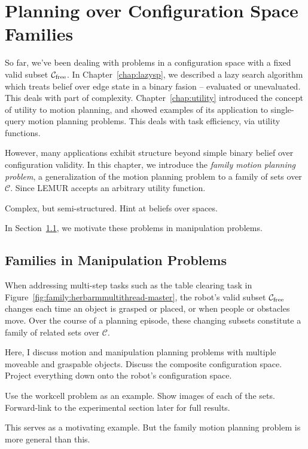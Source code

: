 \chapter{Planning over Configuration Space Families}
\label{chap:family}

So far, we've been dealing with problems in a configuration space
with a fixed valid subset $\mathcal{C}_{\mbox{\scriptsize free}}$.
In Chapter~\ref{chap:lazysp},
we described a lazy search algorithm which treats belief over edge
state in a binary fasion -- evaluated or unevaluated.
This deals with part of complexity.
Chapter~\ref{chap:utility} introduced the concept of utility to
motion planning,
and showed examples of its application to single-query motion
planning problems.
This deals with task efficiency, via utility functions.

However,
many applications exhibit structure beyond simple binary belief over
configuration validity.
In this chapter,
we introduce the \emph{family motion planning problem},
a generalization of the motion planning problem to a family of sets
over $\mathcal{C}$.
Since LEMUR accepts an arbitrary utility function.

Complex, but semi-structured.
Hint at beliefs over spaces.

In Section~\ref{sec:family:families-in-manipulation},
we motivate these problems in manipulation problems.

\section{Families in Manipulation Problems}
\label{sec:family:families-in-manipulation}

When addressing multi-step tasks
such as the table clearing task in
Figure~\ref{fig:family:herbarmmultithread-master},
the robot's valid subset $\mathcal{C}_{\mbox{\scriptsize free}}$
changes each time an object is grasped or placed,
or when people or obstacles move.
Over the course of a planning episode,
these changing subsets constitute a family of related sets over
$\mathcal{C}$.

Here, I discuss motion and manipulation planning problems with
multiple moveable and graspable objects.
Discuss the composite configuration space.
Project everything down onto the robot's configuration space.

Use the workcell problem as an example.
Show images of each of the sets.
Forward-link to the experimental section later for full results.

This serves as a motivating example.
But the family motion planning problem is more general than this.

